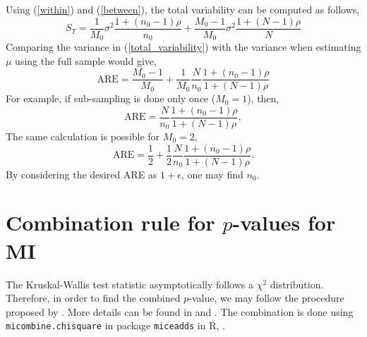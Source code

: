 \documentclass[11pt,a5paper,twoside]{book}
\begin{document}
{\begin{equation}
\end{equation}
Using (\ref{within}) and (\ref{between}), the total variability can be computed as follows,
\begin{equation}
\label{total_variability}
S_T= \frac{1}{M_0} \sigma^2 \frac{1+ (n_0-1) \rho }{n_0} + \frac{M_0-1}{M_0} \sigma^2 \frac{1+ (N-1) \rho}{N}
\end{equation}
Comparing the variance in (\ref{total_variability}) with the variance when estimating $\mu$ using the full sample would give,
\begin{equation}
\label{ARE}
\mathrm{ARE} = \frac{M_0-1}{M_0} + \frac{1}{M_0} \frac{N}{n_0} \frac{1+(n_0-1) \rho}{1+ (N-1) \rho}
\end{equation}
For example, if sub-sampling is done only once ($M_0=1$), then,
\begin{equation}
\label{ARE_M1}
\mathrm{ARE} = \frac{N}{n_0} \frac{1+(n_0-1) \rho}{1+(N-1) \rho},
\end{equation}
The same calculation is possible for $M_0=2$,
\begin{equation}
\label{are_M02}
\mathrm{ARE}= \frac{1}{2} + \frac{1}{2} \frac{N}{n_0} \frac{1+(n_0-1) \rho}{1+ (N-1) \rho}.
\end{equation}
By considering the desired ARE as $1+\epsilon$, one may find $n_0$.


\setcounter{equation}{0}
\section{Combination rule for $p$-values for MI}
\label{app_mi}

The Kruskal-Wallis test statistic asymptotically follows a $\chi^2$ distribution. Therefore, in order to find the combined $p$-value, we may follow the procedure proposed by \cite{li1991}. More details can be found in \cite{rubin2004} and \cite{enders2010}. The combination is done using {\tt{micombine.chisquare}} in package {\tt{miceadds}} in \textsf{R}, \cite{miceadds}.

}
\end{document}
